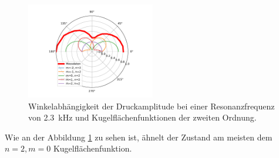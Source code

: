 \begin{figure}
    \centering
    \includegraphics[width=0.5\textwidth]{figure/9mmZwischenring_n2.pdf}
    \caption{Winkelabhängigkeit der Druckamplitude bei einer Resonanzfrequenz von \SI{2.3}{\kilo\hertz} und Kugelflächenfunktionen der zweiten Ordnung.}
    \label{fig:9mmZwischenring_n2}
\end{figure}
\FloatBarrier
Wie an der Abbildung \ref{fig:9mmZwischenring_n2} zu sehen ist, ähnelt der Zustand am meisten dem $n=2,m=0$ Kugelflächenfunktion.

